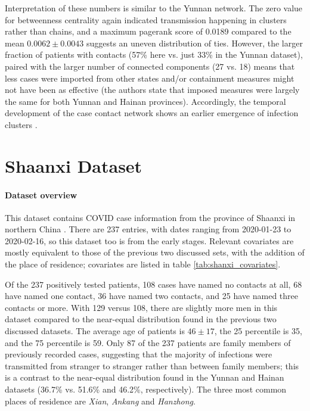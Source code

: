 Interpretation of these numbers is similar to the Yunnan network. The zero value for betweenness centrality again indicated transmission happening in clusters rather than chains, and a maximum pagerank score of 0.0189 compared to the mean $0.0062\pm0.0043$ suggests an uneven distribution of ties. However, the larger fraction of patients with contacts (57\% here vs. just 33\% in the Yunnan dataset), paired with the larger number of connected components (27 vs. 18) means that less cases were imported from other states and/or containment measures might not have been as effective (the authors state that imposed measures were largely the same for both Yunnan and Hainan provinces). Accordingly, the temporal development of the case contact network shows an earlier emergence of infection clusters \cite{hainan_publication}.

\section{Shaanxi Dataset}
\label{sec:shaanxi_data}

\paragraph{Dataset overview} This dataset contains COVID case information from the province of Shaanxi in northern China \cite{shaanxi_data}. There are 237 entries, with dates ranging from 2020-01-23 to 2020-02-16, so this dataset too is from the early stages. Relevant covariates are mostly equivalent to those of the previous two discussed sets, with the addition of the place of residence; covariates are listed in table \ref{tab:shanxi_covariates}. 

Of the 237 positively tested patients, 108 cases have named no contacts at all, 68 have named one contact, 36 have named two contacts, and 25 have named three contacts or more.  With 129 versus 108, there are slightly more men in this dataset compared to the near-equal distribution found in the previous two discussed datasets. The average age of patients is $46\pm17$, the 25 percentile is 35, and the 75 percentile is 59. Only 87 of the 237 patients are family members of previously recorded cases, suggesting that the majority of infections were transmitted from stranger to stranger rather than between family members; this is a contrast to the near-equal distribution found in the Yunnan and Hainan datasets (36.7\% vs. 51.6\% and 46.2\%, respectively). The three most common places of residence are \emph{Xian}, \emph{Ankang} and \emph{Hanzhong}.

